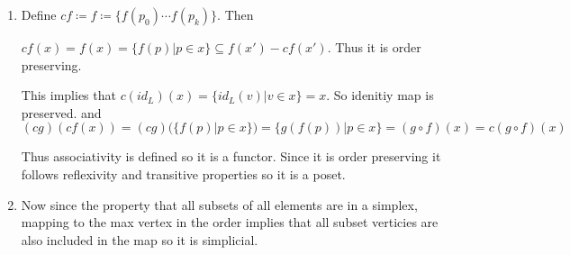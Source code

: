 \documentclass[12pt]{amsart}
\begin{document}
\begin{problem}
\begin{enumerate}
    \item Define $cf\coloneq f\coloneq\{f(p_0)\cdots f(p_k)\}$. Then 
     
    $cf(x)=f(x)=\{f(p)| p\in x\} \subseteq f(x')-cf(x')$. Thus it is order preserving. 

    This implies that $c(id_L)(x) = \{id_L(v)| v\in x\} = x$. So idenitiy map is preserved. and
    \[(cg)(cf(x)) = (cg)(\{f(p) | p\in x\}) = \{g(f(p)) | p\in x\} = (g\circ f)(x)= c(g\circ f)(x)\]

    Thus associativity is defined so it is a functor. Since it is order preserving it follows reflexivity and transitive properties so it is a poset. 

  \item Now since the property that all subsets of all elements are in a simplex, mapping to the max vertex in the order implies that all subset verticies are also included in the map so it is simplicial.
  \end{enumerate} 
  \end{problem}
\end{document}
